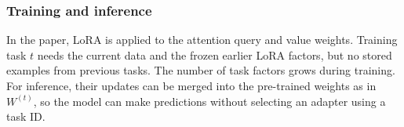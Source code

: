 \subsubsection{Training and inference}

In the paper, LoRA is applied to the attention query and value weights. Training task $t$ needs the current data and the frozen earlier LoRA factors, but no stored examples from previous tasks. The number of task factors grows during training. For inference, their updates can be merged into the pre-trained weights as in $W^{(t)}$, so the model can make predictions without selecting an adapter using a task ID.
